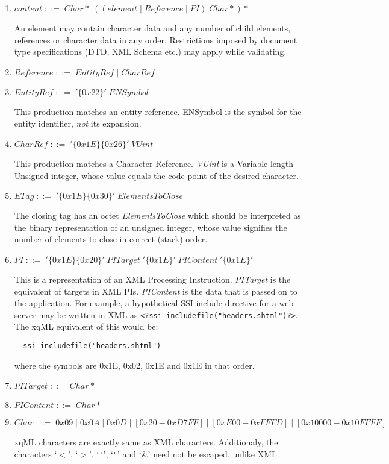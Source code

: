 \begin{enumerate}
\item \label{pr:content} \(content\;::=\;Char*\;((element\;|\;Reference\;|\;PI)\;Char*)* \)

An element may contain character data and any number of child
elements, references or character data in any order. Restrictions
imposed by document type specifications (DTD, XML Schema etc.) may
apply while validating.

\item \label{pr:Reference} \(Reference\;::=\;EntityRef\;|\;CharRef \)

\item \label{pr:EntityRef} \(EntityRef\;::=\;'\{0x22\}'\;ENSymbol \)

This production matches an entity reference. ENSymbol is the symbol
for the entity identifier, \emph{not} its expansion.

\item \label{pr:CharRef} \(CharRef\;::=\;'\{0x1E\}\{0x26\}'\;VUint\; \)

This production matches a Character Reference. {\it VUint} is a
Variable-length Unsigned integer, whose value equals the code point of
the desired character.

\item \label{pr:ETag} \(ETag\;::=\;'\{0x1E\}\{0x30\}'\;ElementsToClose \)

The closing tag has an octet \textit{ElementsToClose} which should be
interpreted as the binary representation of an unsigned integer, whose
value signifies the number of elements to close in correct (stack)
order.

\item \label{pr:PI} \(PI\;::=\;'\{0x1E\}\{0x20\}'\;PITarget\;'\{0x1E\}'\;PIContent\;'\{0x1E\}' \)

This is a representation of an XML Processing
Instruction. \textit{PITarget} is the equivalent of targets in XML
PIs. \textit{PIContent} is the data that is passed on to the
application. For example, a hypothetical SSI include directive for a
web server may be written in XML as
\verb|<?ssi includefile("headers.shtml")?>|. The xqML equivalent of
this would be:
\begin{center} \verb*|  ssi includefile("headers.shtml") | \end{center}
where the symbols are 0x1E, 0x02, 0x1E and 0x1E in that order.

\item \label{pr:PITarget} \(PITarget\;::=\;Char* \) 

\item \label{pr:PIContent} \(PIContent\;::=\;Char* \)

\item \label{pr:Char} \(Char\;::=\;0x09\;|\;0x0A\;|\;0x0D\;|\;[0x20-0xD7FF]\;|\;[0xE00-0xFFFD]\;|\;[0x10000-0x10FFFF] \)

xqML characters are exactly same as XML characters. Additionaly, the
characters `$<$', `$>$', `\verb|'|', `\verb|"|' and `\&' need not be
escaped, unlike XML.

\end{enumerate}
